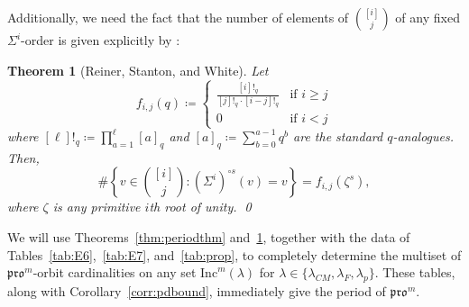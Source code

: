\documentclass[12pt]{amsart}
\newtheorem{theorem}{Theorem}[section]
\theoremstyle{definition}
\theoremstyle{remark}
\numberwithin{equation}{section}
\newcommand{\inc}{\ensuremath{\mathrm{Inc}}}
\newcommand{\pro}{\mathfrak{pro}}
\begin{document}
 Additionally, we need the fact that the number of elements of $\binom{[i]}{j}$ of any fixed $\Sigma^i$-order is given explicitly by \cite[Theorem~1.1(b)]{Reiner.Stanton.White}:
\begin{theorem}[Reiner, Stanton, and White]\label{thm:rsw}
Let 
\begin{equation*}
f_{i,j}(q) \coloneqq 
\begin{cases}
 \frac{[i]!_q}{[j]!_q\cdot [i-j]!_q} & \text{if } i \geq j \\
 0 & \text{if } i < j 
\end{cases}
\end{equation*}
where $[\ell]!_q \coloneqq \prod_{a=1}^\ell [a]_q$ and $[a]_q \coloneqq \sum_{b = 0}^{a-1} q^b$ are the standard $q$-analogues. Then, 
\[\#\left\{ v \in \binom{[i]}{j} : (\Sigma^i)^{\circ s}(v) = v \right\} = f_{i,j}(\zeta^s),\] where $\zeta$ is any primitive $i$th root of unity. \qed
\end{theorem} 
We will use Theorems~\ref{thm:periodthm} and~\ref{thm:rsw}, together with the data of Tables~\ref{tab:E6},~\ref{tab:E7}, and~\ref{tab:prop}, to completely determine the multiset of $\pro^m$-orbit cardinalities on any set $\inc^m(\lambda)$ for $\lambda \in \{ \lambda_{CM}, \lambda_F, \lambda_p \}$. These tables, along with Corollary~\ref{corr:pdbound}, immediately give the period of $\pro^m$.
\end{document}
